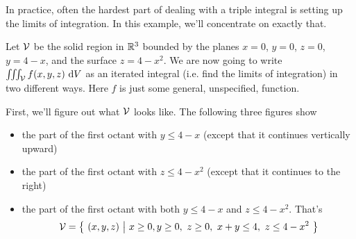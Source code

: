 \begin{eg}\label{eg 3d limits of integration}
In practice, often the hardest part of dealing with
a triple integral is setting up the limits of integration.
In this example, we'll concentrate on exactly that.

Let $\mathcal{V}$ be the solid region in $\mathbb{R}^3$ bounded by the planes 
$x = 0$, $y = 0$, $z=0$, $y = 4 - x$, and the surface $z = 4 - x^2$. We
are now going to write
$\iiint_{\mathcal{V}} f(x, y, z)\ \mathrm{d}V$ as an iterated integral 
(i.e. find the limits of integration) in two different ways.
Here $f$ is just some general, unspecified, function.

First, we'll figure out what $\mathcal{V}$ looks like.
The following three figures show
\begin{itemize}
\item
the part of the first octant with $y \le 4 - x$  (except that 
it continues vertically upward)
\item
the part of the first octant with $z \le 4 - x^2$ (except that it
continues to the right)
\item 
the part of the first octant with both $y\le 4-x$ and  $z \le 4 - x^2$.
That's 
\begin{equation*}
\mathcal{V}=\big\{ \ (x,y,z)\ \big|\ x\ge 0, y\ge 0,\  z\ge 0,\ x+y\le 4,\ z\le 4-x^2\ \big\}
\end{equation*}
\end{itemize}


\end{eg}
